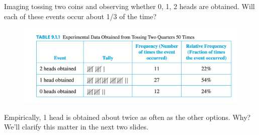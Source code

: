 \documentclass[10pt]{beamer}
\begin{document}
\begin{frame}

\begin{myyellowbox}[title=Poll]
Imaging tossing two coins and observing whether 0, 1, 2 heads are obtained.  Will each of these events occur about 1/3 of the time?
\end{myyellowbox}

\pause 
\vfill 

\begin{figure}
\includegraphics[width=.8\textwidth]{images/coins_1.png}	
\end{figure}

Empirically, 1 head is obtained about twice as often as the other options. Why?  \pause  We'll clarify this matter in the next two slides.



	
\end{frame}
\end{document}
